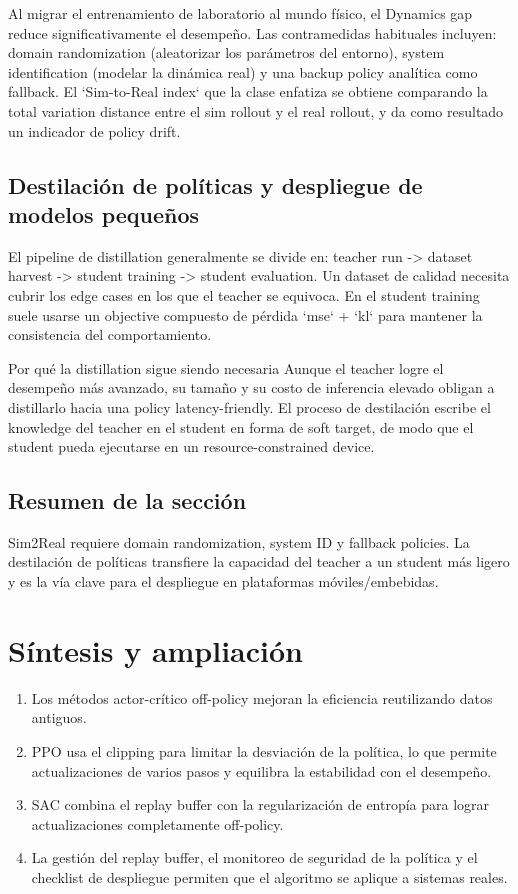 \documentclass[a4paper]{article}
\begin{document}
Al migrar el entrenamiento de laboratorio al mundo físico, el Dynamics gap reduce significativamente el desempeño. Las contramedidas habituales incluyen: domain randomization (aleatorizar los parámetros del entorno), system identification (modelar la dinámica real) y una backup policy analítica como fallback. El `Sim-to-Real index` que la clase enfatiza se obtiene comparando la total variation distance entre el sim rollout y el real rollout, y da como resultado un indicador de policy drift.

\subsection{Destilación de políticas y despliegue de modelos pequeños}

El pipeline de distillation generalmente se divide en: teacher run -> dataset harvest -> student training -> student evaluation. Un dataset de calidad necesita cubrir los edge cases en los que el teacher se equivoca. En el student training suele usarse un objective compuesto de pérdida `mse` + `kl` para mantener la consistencia del comportamiento.

\begin{knowledgebox}{Por qué la distillation sigue siendo necesaria}
Aunque el teacher logre el desempeño más avanzado, su tamaño y su costo de inferencia elevado obligan a distillarlo hacia una policy latency-friendly. El proceso de destilación escribe el knowledge del teacher en el student en forma de soft target, de modo que el student pueda ejecutarse en un resource-constrained device.
\end{knowledgebox}

\subsection{Resumen de la sección}

Sim2Real requiere domain randomization, system ID y fallback policies. La destilación de políticas transfiere la capacidad del teacher a un student más ligero y es la vía clave para el despliegue en plataformas móviles/embebidas.

\section{Síntesis y ampliación}

\begin{enumerate}
    \item Los métodos actor-crítico off-policy mejoran la eficiencia reutilizando datos antiguos.
    \item PPO usa el clipping para limitar la desviación de la política, lo que permite actualizaciones de varios pasos y equilibra la estabilidad con el desempeño.
    \item SAC combina el replay buffer con la regularización de entropía para lograr actualizaciones completamente off-policy.
    \item La gestión del replay buffer, el monitoreo de seguridad de la política y el checklist de despliegue permiten que el algoritmo se aplique a sistemas reales.
\end{enumerate}
\end{document}
